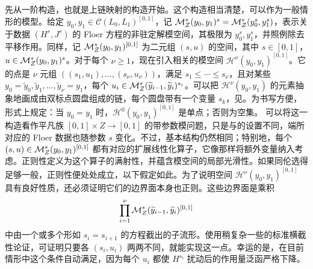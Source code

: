 先从一阶构造，也就是上链映射的构造开始。这个构造相当清楚，可以作为一般情形的模型。给定 $y_0,y_1\in \mathcal C(L_0,L_1)^{[0,1]}$，记 $\mathcal M_Z^*(y_0,y_1)^s=\mathcal M_Z^*(y_0^s,y_1^s)$，表示关于数据 $(H^s,J^s)$ 的 Floer 方程的非驻定解模空间，其极限为 $y_0^s,y_1^s$，并照例除去平移作用。同样，记 $\mathcal M_Z^*(y_0,y_1)^{[0,1]}$ 为二元组 $(s,u)$ 的空间，其中 $s\in[0,1]$，$u\in\mathcal M_Z^*(y_0,y_1)^s$。对于每个 $\nu\geq1$，现在引入相关的模空间 $\mathcal H^\nu(y_0,y_1)^{[0,1]}$。它的点是 $\nu$ 元组 $((s_1,u_1),\ldots,(s_\nu,u_\nu))$，满足 $s_1\leq\cdots\leq s_\nu$，且对某些 $y_0=\widetilde y_0,\widetilde y_1,\ldots,\widetilde y_\nu=y_1$，每个 $u_i\in\mathcal M_Z^*(\widetilde y_{i-1},\widetilde y_i)^{s_i}$。可以把 $\mathcal H^\nu(y_0,y_1)$ 的元素抽象地画成由双标点圆盘组成的链，每个圆盘带有一个变量 $s_k$，见。为书写方便，形式上规定：当 $y_0=y_1$ 时，$\mathcal H^0(y_0,y_1)^{[0,1]}$ 是单点；否则为空集。
可以将这一构造看作平凡族 $[0,1]\times Z\to[0,1]$ 的带参数模问题，只是与的设置不同，端所对应的 Floer 数据也随参数 $s$ 变化。不过，基本结构仍然相同；特别地，每个 $(s,u)\in\mathcal M_Z^*(y_0,y_1)^{[0,1]}$ 都有对应的扩展线性化算子，它像那样将额外变量纳入考虑。正则性定义为这个算子的满射性，并蕴含模空间的局部光滑性。如果同伦选得足够一般，正则性便处处成立，以下假定如此。为了说明空间 $\mathcal H^\nu(y_0,y_1)^{[0,1]}$ 具有良好性质，还必须证明它们的边界面本身也正则。这些边界面是乘积
\[
\prod_{i=1}^\nu\mathcal M_Z^*(\widetilde y_{i-1},\widetilde y_i)^{[0,1]}
\]
中由一个或多个形如 $s_i=s_{i+1}$ 的方程截出的子流形。使用稍复杂一些的标准横截性论证，可证明只要各 $(s_i,u_i)$ 两两不同，就能实现这一点。幸运的是，在目前情形中这个条件自动满足，因为每个 $u_i$ 都使 $H^{s_i}$ 扰动后的作用量泛函严格下降。


